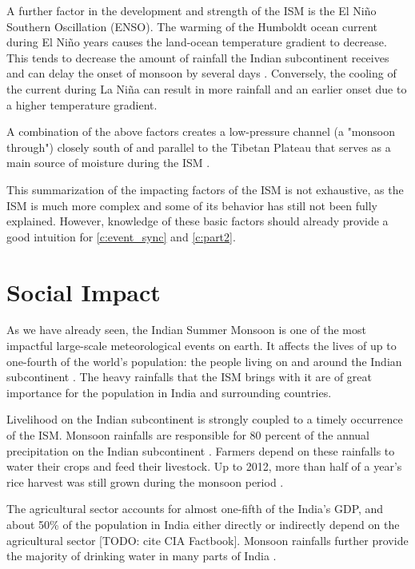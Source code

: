 A further factor in the development and strength of the ISM is the El Niño Southern Oscillation (ENSO). The warming of the Humboldt ocean current during El Niño years causes the land-ocean temperature gradient to decrease. This tends to decrease the amount of rainfall the Indian subcontinent receives and can delay the onset of monsoon by several days \citep{Pradhan.2017, Willetts.2017}. Conversely, the cooling of the current during La Niña can result in more rainfall and an earlier onset due to a higher temperature gradient.

A combination of the above factors creates a low-pressure channel (a "monsoon through") closely south of and parallel to the Tibetan Plateau that serves as a main source of moisture during the ISM \citep{Stolbova.2015}.

This summarization of the impacting factors of the ISM is not exhaustive, as the ISM is much more complex and some of its behavior has still not been fully explained. However, knowledge of these basic factors should already provide a good intuition for \cref{c:event_sync} and \cref{c:part2}.

\section{Social Impact}
\label{st:ism_impact}
As we have already seen, the Indian Summer Monsoon is one of the most impactful large-scale meteorological events on earth. It affects the lives of up to one-fourth of the world's population: the people living on and around the Indian subcontinent \citep{Stolbova.2015}. The heavy rainfalls that the ISM brings with it are of great importance for the population in India and surrounding countries.

Livelihood on the Indian subcontinent is strongly coupled to a timely occurrence of the ISM. Monsoon rainfalls are responsible for 80 percent of the annual precipitation on the Indian subcontinent \citep{Jin.2017}. Farmers depend on these rainfalls to water their crops and feed their livestock. Up to 2012, more than half of a year's rice harvest was still grown during the monsoon period \citep{Auffhammer.2012}.

The agricultural sector accounts for almost one-fifth of the India's GDP, and about 50\% of the population in India either directly or indirectly depend on the agricultural sector [TODO: cite CIA Factbook]. Monsoon rainfalls further provide the majority of drinking water in many parts of India \citep{Stolbova.2015}.

